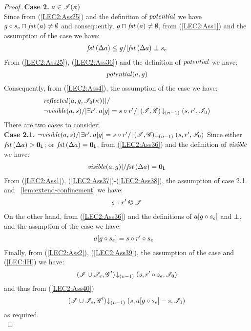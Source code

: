 \begin{lemma}
\begin{proof}
\noindent\textbf{Case 2. }$a \in \mathscr{I}(\kappa_{})$\\
Since from (\ref{LEC2:Ass25}) and the definition of $\mathit{potential}$ we have $g \circ s_e \sqcap_{} \mathit{fst}\left(a\right) \not= \emptyset$ and consequently, $g \sqcap_{} \mathit{fst}\left(a\right) \not= \emptyset$, from (\ref{LEC2:Ass1}) and the assumption of the case we have:
%
\begin{align}
	\mathit{fst}\left(\Delta {a}\right) \leq g /| \mathit{fst}\left(\Delta {a}\right) \mathrel{\bot} s_e \label{LEC2:Ass36}
\end{align}
% 
From (\ref{LEC2:Ass25}), (\ref{LEC2:Ass36}) and the definition of $\mathit{potential}$ we have:
%
\begin{align}
	\mathit{potential}(a, g) \label{LEC2:Ass37}
\end{align}
Consequently, from (\ref{LEC2:Ass4}), the assumption of the case we have:
%
\begin{align*}
	&\mathit{reflected}(a, g, \mathscr{I}_0(\kappa_{})) |/ \\
	&\neg\mathit{visible}(a, s) /| \exists r'.\, a[g] = s \circ r' /| \left(\mathscr{I}, \mathscr{G}\right) \!\downarrow_{(n-1)} \left(s, r', \mathscr{I}_0\right)
\end{align*}
%
There are two cases to consider:\\

\noindent\textbf{Case 2.1.} 
%
$
	\neg\mathit{visible}(a, s) /| \exists r'.\, a[g] = s \circ r' /| \left(\mathscr{I}, \mathscr{G}\right) \!\downarrow_{(n-1)} \left(s, r', \mathscr{I}_0\right)
$
%
Since either $\mathit{fst}\left(\Delta {a}\right) > \mathbf{0}_{\textsf{L}}$; or $\mathit{fst}\left(\Delta {a}\right) = \mathbf{0}_{\textsf{L}}$, from (\ref{LEC2:Ass36}) and the definition of $\mathit{visible}$ we have:
%
\begin{align}
	\mathit{visible}(a, g) |/ \mathit{fst}\left(\Delta {a}\right) = \mathbf{0}_{\textsf{L}} \label{LEC2:Ass38}
\end{align}
%
From (\ref{LEC2:Ass1}), (\ref{LEC2:Ass37})-(\ref{LEC2:Ass38}), the assumption of case 2.1. and \lem~\ref{lem:extend-confinement} we have:
%
\begin{align}
	s \composeL r' \confines \lmod  \label{LEC2:Ass39}
\end{align}
%
On the other hand, from (\ref{LEC2:Ass36}) and the definitions of $a[g \circ s_e]$ and $\mathrel{\bot}$, and the assmption of the case we have: 
%
\begin{align}
	& a[g \circ s_e] = s \circ r' \circ s_e \label{LEC2:Ass40}
\end{align}
%
Finally, from (\ref{LEC2:Ass2}), (\ref{LEC2:Ass39}), the assumption of the case and (\ref{LEC:IH}) we have:
%
\begin{align*}
	\left(\mathscr{I} \cup \mathscr{I}_{e}, \mathscr{G}'\right) \!\downarrow_{(n-1)} \left(s, r' \circ s_e, \mathscr{I}_0\right)
\end{align*}
%
and thus from (\ref{LEC2:Ass40}) 
%
\begin{align*}
	\left(\mathscr{I} \cup \mathscr{I}_{e}, \mathscr{G}'\right) \!\downarrow_{(n-1)} \left(s, a[g \circ s_e] - s, \mathscr{I}_0\right)
\end{align*}
%
as required.\\


\end{proof}
\end{lemma}
